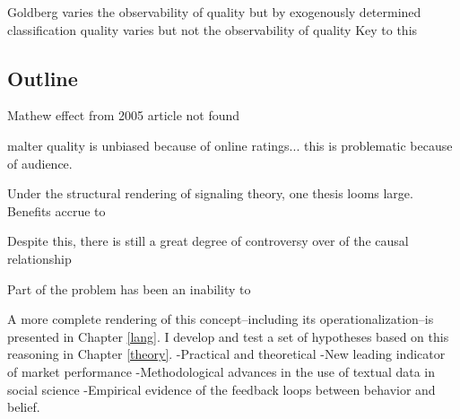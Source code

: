 Goldberg varies the observability of quality but by exogenously determined classification
quality varies but not the observability of quality
Key to this 



\subsection{Outline}

Mathew effect from 2005 article not found

malter quality is unbiased because of online ratings... this is problematic because of audience.


Under the structural rendering of signaling theory, one thesis looms large. Benefits accrue to 

Despite this, there is still a great degree of controversy over of the causal relationship

Part of the problem has been an inability to 

A more complete rendering of this concept--including its operationalization--is presented in Chapter \ref{lang}.
I develop and test a set of hypotheses based on this reasoning in Chapter \ref{theory}.
-Practical and theoretical
-New leading indicator of market performance
-Methodological advances in the use of textual data in social science
-Empirical evidence of the feedback loops between behavior and belief.

